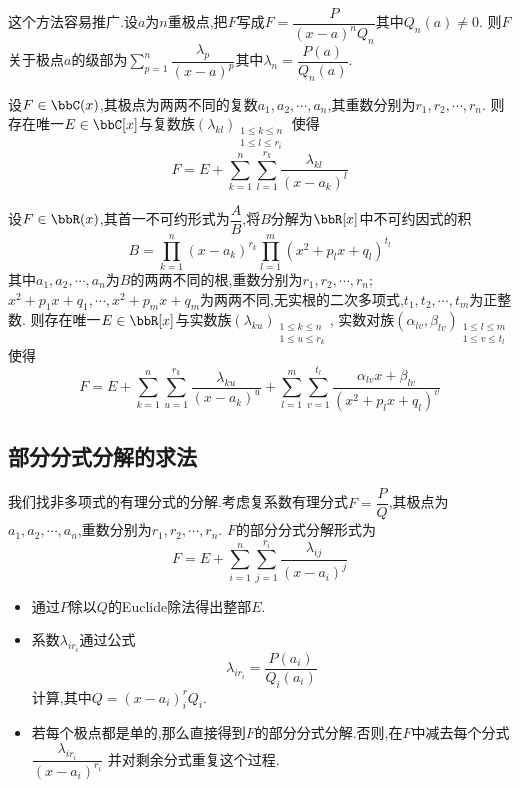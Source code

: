 \begin{rqq}
    这个方法容易推广.设$a$为$n$重极点,把$F$写成$F = \dfrac{P}{(x - a)^n Q_n}$其中$Q_n(a) \neq 0$.
    则$F$关于极点$a$的级部为$\sum\limits_{p = 1}^n \dfrac{\lambda_p}{(x - a)^p}$其中$\lambda_n = \dfrac{P(a)}{Q_n(a)}$.
\end{rqq}

\begin{thm}
    设$F \in \bbC(x)$,其极点为两两不同的复数$a_1, a_2, \cdots, a_n$,其重数分别为$r_1, r_2, \cdots, r_n$.
    则存在唯一$E \in \bbC[x]$与复数族$(\lambda_{kl})_{\substack{1 \leqslant k \leqslant n \\ 1 \leqslant l \leqslant r_i}}$
    使得\[ F = E + \sum\limits_{k = 1}^n \sum\limits_{l = 1}^{r_k} \dfrac{\lambda_{kl}}{(x - a_k)^l} \]
\end{thm}

\begin{thm}
    设$F \in \bbR(x)$,其首一不可约形式为$\dfrac{A}{B}$,将$B$分解为$\bbR[x]$中不可约因式的积
    \[ B = \prod\limits_{k = 1}^n (x - a_k)^{r_k} \prod\limits_{l = 1}^m (x^2 + p_l x + q_l)^{t_l} \]
    其中$a_1, a_2, \cdots, a_n$为$B$的两两不同的根,重数分别为$r_1, r_2, \cdots, r_n$;
    $x^2 + p_1 x + q_1, \cdots, x^2 + p_m x + q_m$为两两不同,无实根的二次多项式,$t_1, t_2, \cdots, t_m$为正整数.
    则存在唯一$E \in \bbR[x]$与实数族$(\lambda_{ku})_{\substack{1 \leqslant k \leqslant n \\ 1 \leqslant u \leqslant r_k}}$,
    实数对族$(\alpha_{lv}, \beta_{lv})_{\substack{1 \leqslant l \leqslant m \\ 1 \leqslant v \leqslant t_l}}$
    使得$$F = E + \sum\limits_{k = 1}^n \sum\limits_{u = 1}^{r_k} \dfrac{\lambda_{ku}}{(x - a_k)^u} +
    \sum\limits_{l = 1}^m \sum\limits_{v = 1}^{t_l} \dfrac{\alpha_{lv} x + \beta_{lv}}{(x^2 + p_l x + q_l)^v}$$
\end{thm}

\subsection*{部分分式分解的求法}

我们找非多项式的有理分式的分解.考虑复系数有理分式$F = \dfrac{P}{Q}$,其极点为$a_1, a_2, \cdots, a_n$,重数分别为$r_1, r_2, \cdots, r_n$.
$F$的部分分式分解形式为\[ F = E + \sum\limits_{i = 1}^n \sum\limits_{j = 1}^{r_i} \dfrac{\lambda_{ij}}{(x - a_i)^j} \]

\begin{itemize}
    \item 通过$P$除以$Q$的Euclide除法得出整部$E$.
    \item 系数$\lambda_{ir_i}$通过公式\[ \lambda_{ir_i} = \dfrac{P(a_i)}{Q_i(a_i)} \]计算,其中$Q = (x - a_i)^r_i Q_i$.
    \item 若每个极点都是单的,那么直接得到$F$的部分分式分解.否则,在$F$中减去每个分式$\dfrac{\lambda_{ir_i}}{(x - a_i)^{r_i}}$
        并对剩余分式重复这个过程.
\end{itemize}

